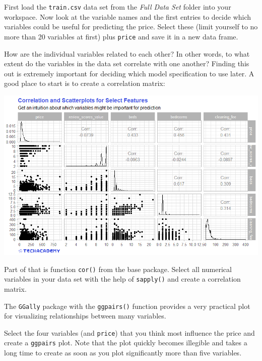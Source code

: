 \documentclass[
  11pt,
]{article}
\newenvironment{tips}[1]
  {
  \begin{itemize}
  \footnotesize
  \renewcommand{\labelitemi}{
    \raisebox{-.7\height}[0pt][0pt]{
      {\setkeys{Gin}{width=3em,keepaspectratio}
        \texttt{[image: images/\#1.png]}}
    }
  }
  \setlength{\fboxsep}{1em}
  \begin{rbox}
  \item
  }
  {
  \end{rbox}
  \end{itemize}
  }
\begin{document}
First load the \texttt{train.csv} data set from the \emph{Full Data Set} folder into your workspace. Now look at the variable names and the first entries to decide which variables could be useful for predicting the price. Select these (limit yourself to no more than 20 variables at first) plus \texttt{price} and save it in a new data frame.

How are the individual variables related to each other? In other words, to what extent do the variables in the data set correlate with one another? Finding this out is extremely important for deciding which model specification to use later. A good place to start is to create a correlation matrix:

\begin{center}\includegraphics[width=1\linewidth]{plot/5_1_ggpairs} \end{center}

\begin{tips}r

Part of that is function \texttt{cor()} from the base package. Select all numerical variables in your data set with the help of \texttt{sapply()} and create a correlation matrix.

The \texttt{GGally} package with the \texttt{ggpairs()} function provides a very practical plot for visualizing relationships between many variables.

Select the four variables (and \texttt{price}) that you think most influence the price and create a \texttt{ggpairs} plot. Note that the plot quickly becomes illegible and takes a long time to create as soon as you plot significantly more than five variables.

\end{tips}
\end{document}

